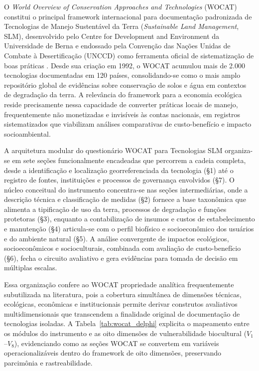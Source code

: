 \documentclass[3p,times]{elsarticle}
\begin{document}
O \textit{World Overview of Conservation Approaches and Technologies} (WOCAT) constitui o principal framework internacional para documentação padronizada de Tecnologias de Manejo Sustentável da Terra (\textit{Sustainable Land Management}, SLM), desenvolvido pelo Centre for Development and Environment da Universidade de Berna e endossado pela Convenção das Nações Unidas de Combate à Desertificação (UNCCD) como ferramenta oficial de sistematização de boas práticas \citep{Liniger2019}. Desde sua criação em 1992, o WOCAT acumulou mais de 2.000 tecnologias documentadas em 120 países, consolidando-se como o mais amplo repositório global de evidências sobre conservação de solos e água em contextos de degradação da terra. A relevância do framework para a economia ecológica reside precisamente nessa capacidade de converter práticas locais de manejo, frequentemente não monetizadas e invisíveis às contas nacionais, em registros sistematizados que viabilizam análises comparativas de custo-benefício e impacto socioambiental.

A arquitetura modular do questionário WOCAT para Tecnologias SLM organiza-se em sete seções funcionalmente encadeadas que percorrem a cadeia completa, desde a identificação e localização georreferenciada da tecnologia (\S1) até o registro de fontes, instituições e processos de governança envolvidos (\S7). O núcleo conceitual do instrumento concentra-se nas seções intermediárias, onde a descrição técnica e classificação de medidas (\S2) fornece a base taxonômica que alimenta a tipificação de uso da terra, processos de degradação e funções protetoras (\S3), enquanto a contabilização de insumos e custos de estabelecimento e manutenção (\S4) articula-se com o perfil biofísico e socioeconômico dos usuários e do ambiente natural (\S5). A análise convergente de impactos ecológicos, socioeconômicos e socioculturais, combinada com avaliação de custo-benefício (\S6), fecha o circuito avaliativo e gera evidências para tomada de decisão em múltiplas escalas.

Essa organização confere ao WOCAT propriedade analítica frequentemente subutilizada na literatura, pois a cobertura simultânea de dimensões técnicas, ecológicas, econômicas e institucionais permite derivar construtos avaliativos multidimensionais que transcendem a finalidade original de documentação de tecnologias isoladas. A Tabela~\ref{tab:wocat_delphi} explicita o mapeamento entre os módulos do instrumento e as oito dimensões de vulnerabilidade biocultural ($V_1$--$V_8$), evidenciando como as seções WOCAT se convertem em variáveis operacionalizáveis dentro do framework de oito dimensões, preservando parcimônia e rastreabilidade.
\end{document}
